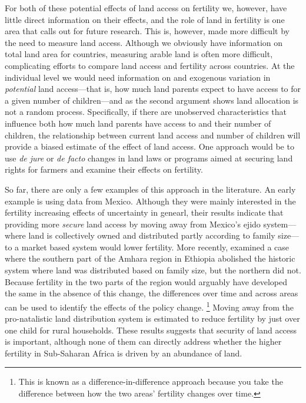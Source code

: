 \documentclass[letterpaper,12pt]{article}
\begin{document}
For both of these potential effects of land access on fertility we,
however, have little direct information on their effects, and the role
of land in fertility is one area that calls out for future research. 
This is, however, made more difficult by the need to measure land
access. 
Although we obviously have information on total land area for countries,
measuring arable land is often more difficult, complicating efforts to
compare land access and fertility across countries. 
At the individual level we would need information on and exogenous
variation in \emph{potential} land access---that is, how much land
parents expect to have access to for a given number of children---and as
the second argument shows land allocation is not a random process. 
Specifically, if there are unobserved characteristics that influence
both how much land parents have access to and their number of children,
the relationship between current land access and number of children will
provide a biased estimate of the effect of land access. 
One approach would be to use \emph{de jure} or \emph{de facto} changes
in land laws or programs aimed at securing land rights for farmers and
examine their effects on fertility.

So far, there are only a few examples of this approach in the literature.
An early example is \citep{de_vany77} using data from Mexico.
Although they were mainly interested in the fertility increasing effects 
of uncertainty in genearl, their results indicate that providing more 
\emph{secure} land access by moving away from Mexico's ejido system---where 
land is collectively owned and distributed partly according to family 
size---to a market based system would lower fertility.
More recently, \citep{Ali2015} examined a case where the southern part of
the Amhara region in Ethiopia abolished the historic system where land 
was distributed based on family size, but the northern did not.
Because fertility in the two parts of the region would arguably have 
developed the same in the absence of this change, the differences over
time and across areas can be used to identify the effects of the
policy change.%
\footnote{
This is known as a difference-in-difference approach because you
take the difference between how the two areas' fertility changes
over time.
}
Moving away from the pro-natalistic land distribution system is
estimated to reduce fertility by just over one child for rural 
households.
These results suggests that security of land access is important, 
although none of them can directly address whether the higher fertility
in Sub-Saharan Africa is driven by an abundance of land.
\end{document}
